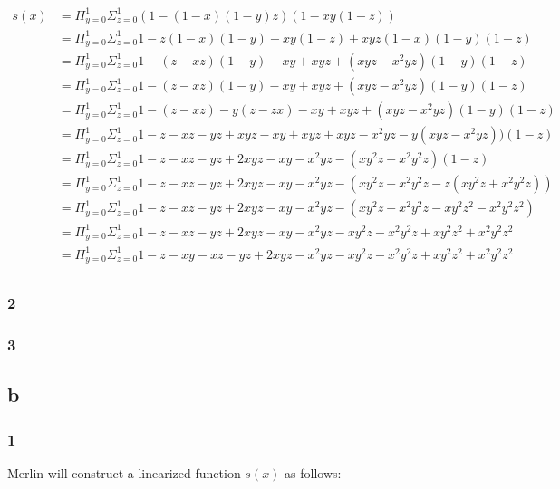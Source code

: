 \documentclass[letterpaper,notitlepage,twoside]{article}
\begin{document}
\begin{align*}
s(x) &= \Pi_{y = 0}^1\Sigma_{z = 0}^1 (1 - (1 - x)(1 - y)z)(1 - xy(1 - z)) \\
     &= \Pi_{y = 0}^1\Sigma_{z = 0}^1 1 - z(1 - x)(1 - y) - xy(1 - z) + xyz(1 - x)(1 - y)(1 - z) \\
     &= \Pi_{y = 0}^1\Sigma_{z = 0}^1 1 - (z - xz)(1 - y) - xy + xyz + (xyz - x^2yz)(1 - y)(1 - z) \\
     &= \Pi_{y = 0}^1\Sigma_{z = 0}^1 1 - (z - xz)(1 - y) - xy + xyz + (xyz - x^2yz)(1 - y)(1 - z) \\
     &= \Pi_{y = 0}^1\Sigma_{z = 0}^1 1 - (z - xz) - y(z - zx) - xy + xyz + (xyz - x^2yz)(1 - y)(1 - z) \\
     &= \Pi_{y = 0}^1\Sigma_{z = 0}^1 1 - z - xz - yz + xyz - xy + xyz + xyz - x^2yz - y(xyz - x^2yz))(1 - z) \\
     &= \Pi_{y = 0}^1\Sigma_{z = 0}^1 1 - z - xz - yz + 2xyz - xy - x^2yz - (xy^2z + x^2y^2z)(1 - z) \\
     &= \Pi_{y = 0}^1\Sigma_{z = 0}^1 1 - z - xz - yz + 2xyz - xy - x^2yz - (xy^2z + x^2y^2z - z(xy^2z + x^2y^2z)) \\
     &= \Pi_{y = 0}^1\Sigma_{z = 0}^1 1 - z - xz - yz + 2xyz - xy - x^2yz - (xy^2z + x^2y^2z - xy^2z^2 - x^2y^2z^2) \\
     &= \Pi_{y = 0}^1\Sigma_{z = 0}^1 1 - z - xz - yz + 2xyz - xy - x^2yz - xy^2z - x^2y^2z + xy^2z^2 + x^2y^2z^2 \\
     &= \Pi_{y = 0}^1\Sigma_{z = 0}^1 1 - z - xy - xz - yz + 2xyz - x^2yz - xy^2z - x^2y^2z + xy^2z^2 + x^2y^2z^2 \\
\end{align*}

\subsubsection*{2}
\subsubsection*{3}

\subsection*{b}
\subsubsection*{1}
Merlin will construct a linearized function $s(x)$ as follows:
\end{document}
